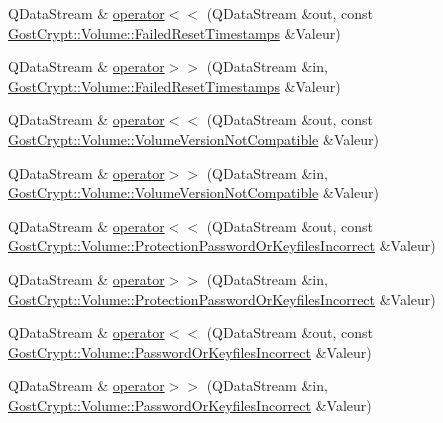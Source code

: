\begin{DoxyCompactItemize}
\item 
Q\+Data\+Stream \& \hyperlink{namespace_gost_crypt_1_1_volume_aa0a176f2ba1064ac134d5dea934193c5}{operator$<$$<$} (Q\+Data\+Stream \&out, const \hyperlink{class_gost_crypt_1_1_volume_1_1_failed_reset_timestamps}{Gost\+Crypt\+::\+Volume\+::\+Failed\+Reset\+Timestamps} \&Valeur)
\item 
Q\+Data\+Stream \& \hyperlink{namespace_gost_crypt_1_1_volume_a715871574235b152aafca7fc6ee054ff}{operator$>$$>$} (Q\+Data\+Stream \&in, \hyperlink{class_gost_crypt_1_1_volume_1_1_failed_reset_timestamps}{Gost\+Crypt\+::\+Volume\+::\+Failed\+Reset\+Timestamps} \&Valeur)
\item 
Q\+Data\+Stream \& \hyperlink{namespace_gost_crypt_1_1_volume_a58a84ba282215833ee77ab809469f80f}{operator$<$$<$} (Q\+Data\+Stream \&out, const \hyperlink{class_gost_crypt_1_1_volume_1_1_volume_version_not_compatible}{Gost\+Crypt\+::\+Volume\+::\+Volume\+Version\+Not\+Compatible} \&Valeur)
\item 
Q\+Data\+Stream \& \hyperlink{namespace_gost_crypt_1_1_volume_a0dc54a56ec153c7b24658324297306f8}{operator$>$$>$} (Q\+Data\+Stream \&in, \hyperlink{class_gost_crypt_1_1_volume_1_1_volume_version_not_compatible}{Gost\+Crypt\+::\+Volume\+::\+Volume\+Version\+Not\+Compatible} \&Valeur)
\item 
Q\+Data\+Stream \& \hyperlink{namespace_gost_crypt_1_1_volume_a78768b201e4b15037324f04a31d48382}{operator$<$$<$} (Q\+Data\+Stream \&out, const \hyperlink{class_gost_crypt_1_1_volume_1_1_protection_password_or_keyfiles_incorrect}{Gost\+Crypt\+::\+Volume\+::\+Protection\+Password\+Or\+Keyfiles\+Incorrect} \&Valeur)
\item 
Q\+Data\+Stream \& \hyperlink{namespace_gost_crypt_1_1_volume_af3d834104cdc24e0405b5576c19a7560}{operator$>$$>$} (Q\+Data\+Stream \&in, \hyperlink{class_gost_crypt_1_1_volume_1_1_protection_password_or_keyfiles_incorrect}{Gost\+Crypt\+::\+Volume\+::\+Protection\+Password\+Or\+Keyfiles\+Incorrect} \&Valeur)
\item 
Q\+Data\+Stream \& \hyperlink{namespace_gost_crypt_1_1_volume_a29fe87bbbb7434977f4c3afba8f28e0e}{operator$<$$<$} (Q\+Data\+Stream \&out, const \hyperlink{class_gost_crypt_1_1_volume_1_1_password_or_keyfiles_incorrect}{Gost\+Crypt\+::\+Volume\+::\+Password\+Or\+Keyfiles\+Incorrect} \&Valeur)
\item 
Q\+Data\+Stream \& \hyperlink{namespace_gost_crypt_1_1_volume_a2284a778eb34929de0d3ada5ac371c9d}{operator$>$$>$} (Q\+Data\+Stream \&in, \hyperlink{class_gost_crypt_1_1_volume_1_1_password_or_keyfiles_incorrect}{Gost\+Crypt\+::\+Volume\+::\+Password\+Or\+Keyfiles\+Incorrect} \&Valeur)

\end{DoxyCompactItemize}
